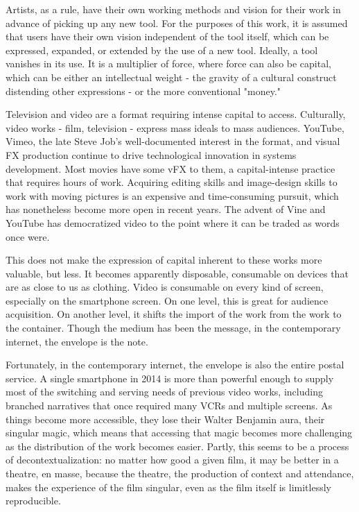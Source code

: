 Artists, as a rule, have their own working methods and vision for their work in advance of picking up any new tool. For the purposes of this work, it is assumed that users have their own vision independent of the tool itself, which can be expressed, expanded, or extended by the use of a new tool. Ideally, a tool vanishes in its use. It is a multiplier of force, where force can also be capital, which can be either an intellectual weight - the gravity of a cultural construct distending other expressions - or the more conventional "money."

Television and video are a format requiring intense capital to access. Culturally, video works - film, television - express mass ideals to mass audiences. YouTube, Vimeo, the late Steve Job's well-documented interest in the format, and visual FX production continue to drive technological innovation in systems development. Most movies have some vFX to them, a capital-intense practice that requires hours of work. Acquiring editing skills and image-design skills to work with moving pictures is an expensive and time-consuming pursuit, which has nonetheless become more open in recent years. The advent of Vine and YouTube has democratized video to the point where it can be traded as words once were.

This does not make the expression of capital inherent to these works more valuable, but less. It becomes apparently disposable, consumable on devices that are as close to us as clothing. Video is consumable on every kind of screen, especially on the smartphone screen. On one level, this is great for audience acquisition. On another level, it shifts the import of the work from the work to the container. Though the medium has been the message, in the contemporary internet, the envelope is the note.

Fortunately, in the contemporary internet, the envelope is also the entire postal service. A single smartphone in 2014 is more than powerful enough to supply most of the switching and serving needs of previous video works, including branched narratives that once required many VCRs and multiple screens. As things become more accessible, they lose their Walter Benjamin aura, their singular magic, which means that accessing that magic becomes more challenging as the distribution of the work becomes easier. Partly, this seems to be a process of decontextualization: no matter how good a given film, it may be better in a theatre, en masse, because the theatre, the production of context and attendance, makes the experience of the film singular, even as the film itself is limitlessly reproducible.

